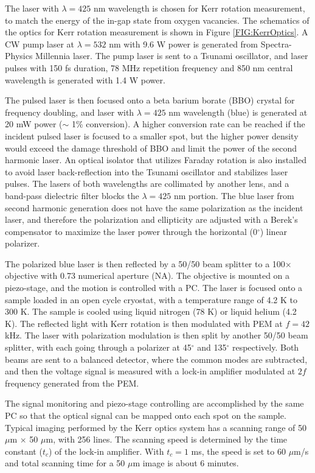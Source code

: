 \documentclass[pdflatex, sectionletters, 12pt]{pittetd}    %
\begin{document}
The laser with $\lambda = 425$ nm wavelength is chosen for Kerr rotation measurement, to match the energy of the in-gap state from oxygen vacancies\cite{rice2014persistent}. The schematics of the optics for Kerr rotation measurement is shown in Figure \ref{FIG:KerrOptics}. A CW pump laser at $\lambda=532$ nm with 9.6 W power is generated from Spectra-Physics Millennia laser. The pump laser is sent to a Tsunami oscillator, and laser pulses with 150 fs duration, 78 MHz repetition frequency and 850 nm central wavelength is generated with 1.4 W power. 

The pulsed laser is then focused onto a beta barium borate (BBO) crystal for frequency doubling, and laser with $\lambda=425$ nm wavelength (blue) is generated at 20 mW power ($\sim$ 1\% conversion). A higher conversion rate can be reached if the incident pulsed laser is focused to a smaller spot, but the higher power density would exceed the damage threshold of BBO and limit the power of the second harmonic laser. An optical isolator that utilizes Faraday rotation is also installed to avoid laser back-reflection into the Tsunami oscillator and stabilizes laser pulses. The lasers of both wavelengths are collimated by another lens, and a band-pass dielectric filter blocks the $\lambda=425$ nm portion. The blue laser from second harmonic generation does not have the same polarization as the incident laser, and therefore the polarization and ellipticity are adjusted with a Berek's compensator to maximize the laser power through the horizontal (0$^{\circ}$) linear polarizer. 

The polarized blue laser is then reflected by a 50/50 beam splitter to a 100$\times$ objective with 0.73 numerical aperture (NA). The objective is mounted on a piezo-stage, and the motion is controlled with a PC. The laser is focused onto a sample loaded in an open cycle cryostat, with a temperature range of 4.2 K to 300 K. The sample is cooled using liquid nitrogen (78 K) or liquid helium (4.2 K). The reflected light with Kerr rotation is then modulated with PEM at $f = 42$ kHz. The laser with polarization modulation is then split by another 50/50 beam splitter, with each going through a polarizer at 45$^{\circ}$ and 135$^{\circ}$ respectively. Both beams are sent to a balanced detector, where the common modes are subtracted, and then the voltage signal is measured with a lock-in amplifier modulated at $2f$ frequency generated from the PEM. 

The signal monitoring and piezo-stage controlling are accomplished by the same PC so that the optical signal can be mapped onto each spot on the sample. Typical imaging performed by the Kerr optics system has a scanning range of 50 $\mu$m $\times$ 50 $\mu$m, with 256 lines. The scanning speed is determined by the time constant ($t_c$) of the lock-in amplifier. With $t_c = 1$ ms, the speed is set to 60 $\mu$m/s and total scanning time for a 50 $\mu$m image is about 6 minutes.
\end{document}
